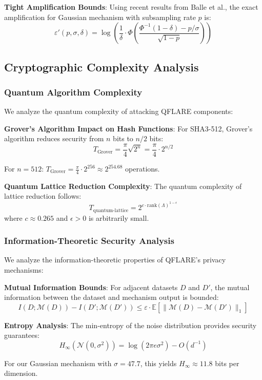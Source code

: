 \documentclass[journal,onecolumn]{IEEEtran}
\begin{document}
\textbf{Tight Amplification Bounds}: Using recent results from Balle et al., the exact amplification for Gaussian mechanism with subsampling rate $p$ is:
$$\varepsilon'(p, \sigma, \delta) = \log\left(\frac{1}{\delta} \cdot \Phi\left(\frac{\Phi^{-1}(1-\delta) - p/\sigma}{\sqrt{1-p}}\right)\right)$$

\subsection{Cryptographic Complexity Analysis}

\subsubsection{Quantum Algorithm Complexity}

We analyze the quantum complexity of attacking QFLARE components:

\textbf{Grover's Algorithm Impact on Hash Functions}:
For SHA3-512, Grover's algorithm reduces security from $n$ bits to $n/2$ bits:
$$T_{\text{Grover}} = \frac{\pi}{4}\sqrt{2^n} = \frac{\pi}{4} \cdot 2^{n/2}$$

For $n = 512$: $T_{\text{Grover}} = \frac{\pi}{4} \cdot 2^{256} \approx 2^{254.68}$ operations.

\textbf{Quantum Lattice Reduction Complexity}:
The quantum complexity of lattice reduction follows:
$$T_{\text{quantum-lattice}} = 2^{c \cdot \text{rank}(\Lambda)^{1-\epsilon}}$$
where $c \approx 0.265$ and $\epsilon > 0$ is arbitrarily small.

\subsubsection{Information-Theoretic Security Analysis}

We analyze the information-theoretic properties of QFLARE's privacy mechanisms:

\textbf{Mutual Information Bounds}:
For adjacent datasets $D$ and $D'$, the mutual information between the dataset and mechanism output is bounded:
$$I(D; \mathcal{M}(D)) - I(D'; \mathcal{M}(D')) \leq \varepsilon \cdot \mathbb{E}[\|\mathcal{M}(D) - \mathcal{M}(D')\|_1]$$

\textbf{Entropy Analysis}:
The min-entropy of the noise distribution provides security guarantees:
$$H_\infty(\mathcal{N}(0, \sigma^2)) = \log(2\pi e \sigma^2) - O(d^{-1})$$

For our Gaussian mechanism with $\sigma = 47.7$, this yields $H_\infty \approx 11.8$ bits per dimension.
\end{document}
